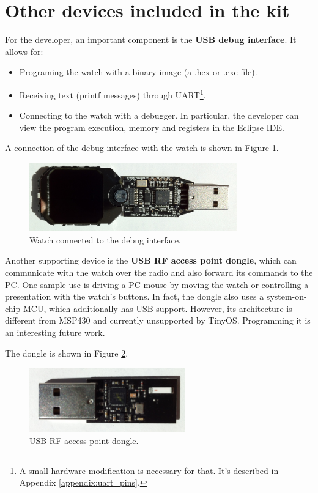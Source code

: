 \section{Other devices included in the kit}

For the developer, an important component is the {\bf USB debug
interface}. It allows for:
\begin{itemize}
  \item Programing the watch with a binary image (a .hex or .exe file).
  \item Receiving text (printf messages) through UART\footnote{A small
    hardware modification is necessary for that. It's described in
    Appendix \ref{appendix:uart_pins}.}.
  \item Connecting to the watch with a debugger. In particular, the
    developer can view the program execution, memory and registers in
    the Eclipse IDE.
\end{itemize}
A connection of the debug interface with the watch is shown in Figure
\ref{fig:chronos_dongle}.

\begin{figure}[h]
  \centering
  \includegraphics[width=0.8\textwidth]{img/chronos_dongle.jpg}
  \caption{Watch connected to the debug interface.}
  \label{fig:chronos_dongle}
\end{figure}

Another supporting device is the {\bf USB RF access point dongle},
which can communicate with the watch over the radio and also forward
its commands to the PC. One sample use is driving a PC mouse by
moving the watch or controlling a presentation with the watch's
buttons. In fact, the dongle also uses a system-on-chip MCU, which
additionally has USB support. However, its architecture is different
from MSP430 and currently unsupported by TinyOS. Programming it is an
interesting future work.

The dongle is shown in Figure \ref{fig:chronos_rfdongle}.

\begin{figure}[h]
  \centering
  \includegraphics[width=0.6\textwidth]{img/chronos_rfdongle.jpg}
  \caption{USB RF access point dongle.}
  \label{fig:chronos_rfdongle}
\end{figure}

